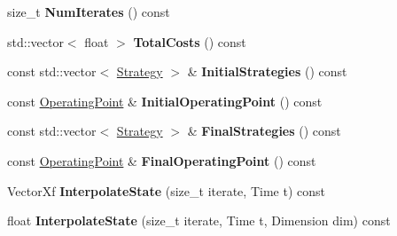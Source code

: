 \begin{DoxyCompactItemize}
\item 
size\+\_\+t {\bfseries Num\+Iterates} () const \hypertarget{classilqgames_1_1_solver_log_a205590ee3aadd88aaf11ef6b5bb774dc}{}\label{classilqgames_1_1_solver_log_a205590ee3aadd88aaf11ef6b5bb774dc}

\item 
std\+::vector$<$ float $>$ {\bfseries Total\+Costs} () const \hypertarget{classilqgames_1_1_solver_log_a175236dc1d4d3028511b0c82500095c5}{}\label{classilqgames_1_1_solver_log_a175236dc1d4d3028511b0c82500095c5}

\item 
const std\+::vector$<$ \hyperlink{structilqgames_1_1_strategy}{Strategy} $>$ \& {\bfseries Initial\+Strategies} () const \hypertarget{classilqgames_1_1_solver_log_a2ac6ab2634e314d3eb7cc556850d7636}{}\label{classilqgames_1_1_solver_log_a2ac6ab2634e314d3eb7cc556850d7636}

\item 
const \hyperlink{structilqgames_1_1_operating_point}{Operating\+Point} \& {\bfseries Initial\+Operating\+Point} () const \hypertarget{classilqgames_1_1_solver_log_adf4581a26df80a6b69458f2d4f84deac}{}\label{classilqgames_1_1_solver_log_adf4581a26df80a6b69458f2d4f84deac}

\item 
const std\+::vector$<$ \hyperlink{structilqgames_1_1_strategy}{Strategy} $>$ \& {\bfseries Final\+Strategies} () const \hypertarget{classilqgames_1_1_solver_log_a3e998ebe01b5437dbea33c1e32739cbe}{}\label{classilqgames_1_1_solver_log_a3e998ebe01b5437dbea33c1e32739cbe}

\item 
const \hyperlink{structilqgames_1_1_operating_point}{Operating\+Point} \& {\bfseries Final\+Operating\+Point} () const \hypertarget{classilqgames_1_1_solver_log_ac02232ae7fa57715bc0b1795f4dd059f}{}\label{classilqgames_1_1_solver_log_ac02232ae7fa57715bc0b1795f4dd059f}

\item 
Vector\+Xf {\bfseries Interpolate\+State} (size\+\_\+t iterate, Time t) const \hypertarget{classilqgames_1_1_solver_log_a86b8dd605c03955a6fbafa2dc0b2a341}{}\label{classilqgames_1_1_solver_log_a86b8dd605c03955a6fbafa2dc0b2a341}

\item 
float {\bfseries Interpolate\+State} (size\+\_\+t iterate, Time t, Dimension dim) const \hypertarget{classilqgames_1_1_solver_log_ac81714a5caf9e2f497ed04b58e333757}{}\label{classilqgames_1_1_solver_log_ac81714a5caf9e2f497ed04b58e333757}


\end{DoxyCompactItemize}
